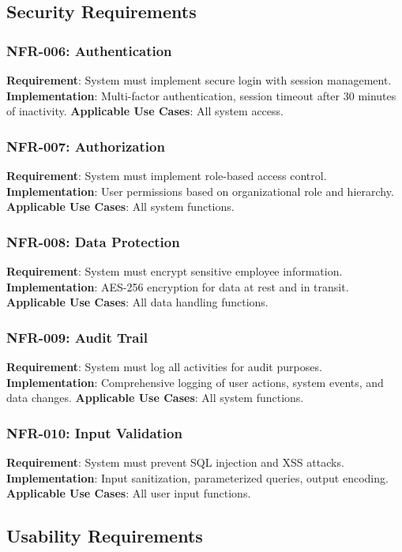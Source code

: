 \documentclass[12pt,a4paper]{article}
\begin{document}
\subsection{Security Requirements}

\subsubsection{NFR-006: Authentication}
\textbf{Requirement}: System must implement secure login with session management.
\textbf{Implementation}: Multi-factor authentication, session timeout after 30 minutes of inactivity.
\textbf{Applicable Use Cases}: All system access.

\subsubsection{NFR-007: Authorization}
\textbf{Requirement}: System must implement role-based access control.
\textbf{Implementation}: User permissions based on organizational role and hierarchy.
\textbf{Applicable Use Cases}: All system functions.

\subsubsection{NFR-008: Data Protection}
\textbf{Requirement}: System must encrypt sensitive employee information.
\textbf{Implementation}: AES-256 encryption for data at rest and in transit.
\textbf{Applicable Use Cases}: All data handling functions.

\subsubsection{NFR-009: Audit Trail}
\textbf{Requirement}: System must log all activities for audit purposes.
\textbf{Implementation}: Comprehensive logging of user actions, system events, and data changes.
\textbf{Applicable Use Cases}: All system functions.

\subsubsection{NFR-010: Input Validation}
\textbf{Requirement}: System must prevent SQL injection and XSS attacks.
\textbf{Implementation}: Input sanitization, parameterized queries, output encoding.
\textbf{Applicable Use Cases}: All user input functions.

\subsection{Usability Requirements}
\end{document}
